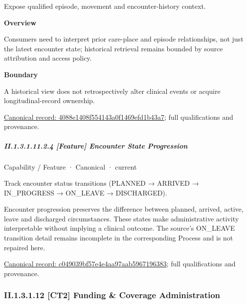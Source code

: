 Expose qualified episode, movement and encounter-history context.



\textbf{Overview}



Consumers need to interpret prior care-place and episode relationships, not just the latest encounter state; historical retrieval remains bounded by source attribution and access policy.



\textbf{Boundary}



A historical view does not retrospectively alter clinical events or acquire longitudinal-record ownership.


{\footnotesize \href{../../../../continuum/strategy/capability/feature/4088e1408f554143a0f1469efd1b43a7.md}{Canonical record: 4088e1408f554143a0f1469efd1b43a7}; full qualifications and provenance.}\par
\subparagraph*{II.1.3.1.11.2.4 [Feature] Encounter State Progression}
\label{navigation:II.1.3.1.11.2.4}

\label{element:c049039bf57e4e4aa97aab5967196383}
{\small Capability / Feature · Canonical · current}\par

Track encounter status transitions (PLANNED → ARRIVED → IN\_PROGRESS → ON\_LEAVE → DISCHARGED).



Encounter progression preserves the difference between planned, arrived, active, leave and discharged circumstances. These states make administrative activity interpretable without implying a clinical outcome. The source's ON\_LEAVE transition detail remains incomplete in the corresponding Process and is not repaired here.


{\footnotesize \href{../../../../continuum/strategy/capability/feature/c049039bf57e4e4aa97aab5967196383.md}{Canonical record: c049039bf57e4e4aa97aab5967196383}; full qualifications and provenance.}\par
\subsubsection*{II.1.3.1.12 [CT2] Funding \& Coverage Administration}
\label{navigation:II.1.3.1.12}

